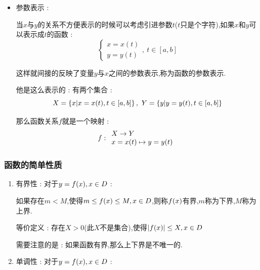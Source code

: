 {{{\begin{itemize}
{              这并不意味着这个函数关系无法讨论,只需要对$y$做限制,比如要求$y \geq 0$,这样一来对于给定的$y$,就有唯一确定的$x$,由此就构成了函数关系.

              需要注意的是并不是所有的隐函数都可以写出显式表达的形式,比如Kepler方程 : $$
                  y = x + \varepsilon \sin y
              $$

              这个方程描述了行星绕太阳运行的轨迹的规律,轨迹是个椭圆.其中$\varepsilon$是这个椭圆的离心,$x$与时间有关,$y$与行星的位置有关.
              }
        \item {
              参数表示 :

              当$x$与$y$的关系不方便表示的时候可以考虑引进参数$t$($t$只是个字符),如果$x$和$y$可以表示成$t$的函数 : $$
                  \begin{cases}
                      x = x(t) \\
                      y = y(t)
                  \end{cases},\ t \in [a,b]
              $$

              这样就间接的反映了变量$y$与$x$之间的参数表示,称为函数的参数表示.

              他是这么表示的 : 有两个集合 : $$
                  X = \left\{ x | x = x(t),t \in [a,b] \right\},\ Y = \left\{ y | y = y(t),t \in [a,b] \right\}
              $$

              那么函数关系$f$就是一个映射 : $$
                  f : \begin{array}{l} X \to Y \\ x = x(t) \mapsto y = y(t) \end{array}
              $$
              }
    \end{itemize}
}%

\subsubsection{函数的简单性质}{
    \begin{enumerate}
        \item {
              有界性 : 对于$y = f(x),x \in D$ :

              如果存在$m < M$,使得$m \leq f(x) \leq M,x \in D$,则称$f(x)$有界,$m$称为下界,$M$称为上界.

              等价定义 : 存在$X > 0$(此$X$不是集合),使得$\left\lvert f(x) \right\vert \leq X,x \in D$

              需要注意的是 : 如果函数有界,那么上下界是不唯一的.
              }
        \item {
              单调性 : 对于$y = f(x),x \in D$ :

}
\end{enumerate}}}}
